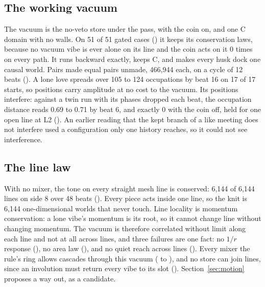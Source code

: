 \subsection{The working vacuum}

The vacuum is the no-veto store under the pass, with the coin on, and one C domain with no walls. On 51 of 51 gated
cases () it keeps its conservation laws, because no vacuum vibe is ever alone on its line and the
coin acts on it 0 times on every path. It runs backward exactly, keeps C, and makes every husk dock one causal world.
Pairs made equal pairs unmade, 466,944 each, on a cycle of 12 beats (). A lone love spreads over 105
to 124 occupations by beat 16 on 17 of 17 starts, so positions carry amplitude at no cost to the vacuum.
Its positions interfere: against a twin run with its phases dropped each beat, the occupation distance reads 0.69 to
0.71 by beat 6, and exactly 0 with the coin off, held for one open line at L2 (). An earlier reading
that the kept branch of a like meeting does not interfere used a configuration only one history reaches, so it could
not see interference.

\subsection{The line law}

With no mixer, the tone on every straight mesh line is conserved: 6,144 of 6,144 lines on side 8 over 48 beats
(). Every piece acts inside one line, so the knit is 6,144 one-dimensional worlds that never touch.
Line locality is momentum conservation: a lone vibe's momentum is its root, so it cannot change line without changing
momentum. The vacuum is therefore correlated without limit along each line and not at all across lines, and three
failures are one fact: no $1/r$ response (), no area law (), and no quiet reach
across lines (). Every mixer the rule's ring allows cascades through this vacuum
( to ), and no store can join lines, since an involution must return every vibe to
its slot (). Section~\ref{sec:motion} proposes a way out, as a candidate.
